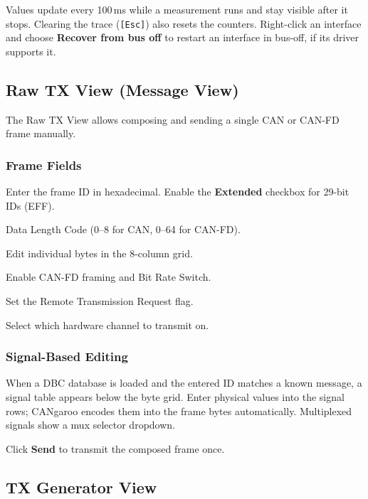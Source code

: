 \documentclass[a4paper,11pt]{article}
\newcommand{\key}[1]{\texttt{\small[#1]}}
\newcommand{\ui}[1]{\textbf{#1}}
\begin{document}
Values update every 100\,ms while a measurement runs and stay visible after it
stops. Clearing the trace (\key{Esc}) also resets the counters. Right-click an
interface and choose \ui{Recover from bus off} to restart an interface in bus-off,
if its driver supports it.

\subsection{Raw TX View (Message View)}
\label{sec:rawtx}

The Raw TX View allows composing and sending a single CAN or CAN-FD frame manually.

\subsubsection{Frame Fields}

\begin{description}[leftmargin=2em, style=nextline]
  \item[Message ID] Enter the frame ID in hexadecimal. Enable the \ui{Extended}
        checkbox for 29-bit IDs (EFF).
  \item[DLC] Data Length Code (0–8 for CAN, 0–64 for CAN-FD).
  \item[Data bytes] Edit individual bytes in the 8-column grid.
  \item[FD / BRS] Enable CAN-FD framing and Bit Rate Switch.
  \item[RTR] Set the Remote Transmission Request flag.
  \item[Interface] Select which hardware channel to transmit on.
\end{description}

\subsubsection{Signal-Based Editing}

When a DBC database is loaded and the entered ID matches a known message, a signal
table appears below the byte grid. Enter physical values into the signal rows;
CANgaroo encodes them into the frame bytes automatically. Multiplexed signals show
a mux selector dropdown.

Click \ui{Send} to transmit the composed frame once.

\subsection{TX Generator View}
\label{sec:txgen}
\end{document}
